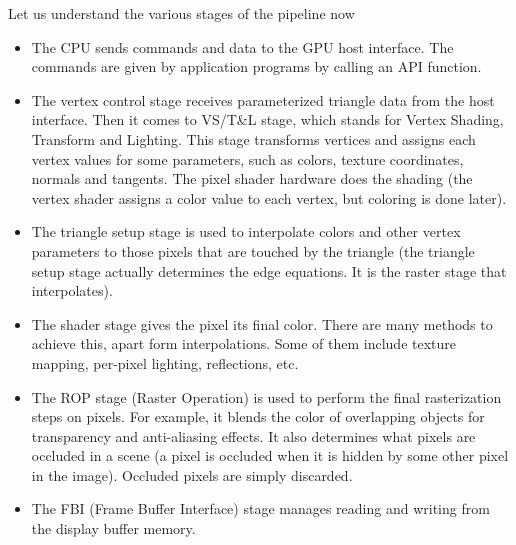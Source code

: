 \documentclass[../notes.tex]{subfiles}
\begin{document}
Let us understand the various stages of the pipeline now
\begin{itemize}
  \item The CPU sends commands and data to the GPU host interface. The commands are given by application programs by calling an API function.
  \item The vertex control stage receives parameterized triangle data from the host interface. Then it comes to VS/T\&L stage, which stands for Vertex Shading, Transform and Lighting. This stage transforms vertices and assigns each vertex values for some parameters, such as colors, texture coordinates, normals and tangents. The pixel shader hardware does the shading (the vertex shader assigns a color value to each vertex, but coloring is done later).
  \item The triangle setup stage is used to interpolate colors and other vertex parameters to those pixels that are touched by the triangle (the triangle setup stage actually determines the edge equations. It is the raster stage that interpolates).
  \item The shader stage gives the pixel its final color. There are many methods to achieve this, apart form interpolations. Some of them include texture mapping, per-pixel lighting, reflections, etc.
  \item The ROP stage (Raster Operation) is used to perform the final rasterization steps on pixels. For example, it blends the color of overlapping objects for transparency and anti-aliasing effects. It also determines what pixels are occluded in a scene (a pixel is occluded when it is hidden by some other pixel in the image). Occluded pixels are simply discarded.
  \item The FBI (Frame Buffer Interface) stage manages reading and writing from the display buffer memory.
\end{itemize}
\end{document}
